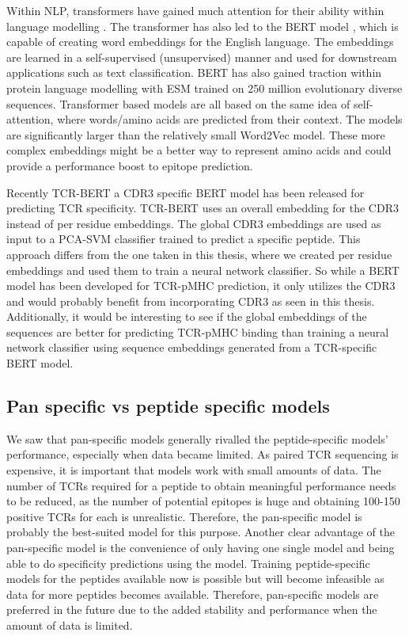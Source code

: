 Within NLP, transformers have gained much attention for their ability within language modelling \cite{Vaswani2017AttentionNeed}. The transformer has also led to the BERT model \cite{Devlin2019BERT:Understanding}, which is capable of creating word embeddings for the English language. The embeddings are learned in a self-supervised (unsupervised) manner and used for downstream applications such as text classification. BERT has also gained traction within protein language modelling with ESM \cite{doi:10.1073/pnas.2016239118} trained on 250 million evolutionary diverse sequences. Transformer based models are all based on the same idea of self-attention, where words/amino acids are predicted from their context. The models are significantly larger than the relatively small Word2Vec model. These more complex embeddings might be a better way to represent amino acids and could provide a performance boost to epitope prediction.

Recently TCR-BERT \cite{Wu2021TCR-BERT:Analyses} a CDR3{\textbeta} specific BERT model has been released for predicting TCR specificity. TCR-BERT uses an overall embedding for the CDR3{\textbeta} instead of per residue embeddings. The global CDR3{\textbeta} embeddings are used as input to a PCA-SVM classifier trained to predict a specific peptide. This approach differs from the one taken in this thesis, where we created per residue embeddings and used them to train a neural network classifier. So while a BERT model has been developed for TCR-pMHC prediction, it only utilizes the CDR3{\textbeta} and would probably benefit from incorporating CDR3{\textalpha} as seen in this thesis. Additionally, it would be interesting to see if the global embeddings of the sequences are better for predicting TCR-pMHC binding than training a neural network classifier using sequence embeddings generated from a TCR-specific BERT model.

\subsection{Pan specific vs peptide specific models}
We saw that pan-specific models generally rivalled the peptide-specific models' performance, especially when data became limited. As paired TCR sequencing is expensive, it is important that models work with small amounts of data. The number of TCRs required for a peptide to obtain meaningful performance needs to be reduced, as the number of potential epitopes is huge and obtaining 100-150 positive TCRs for each is unrealistic. Therefore, the pan-specific model is probably the best-suited model for this purpose. Another clear advantage of the pan-specific model is the convenience of only having one single model and being able to do specificity predictions using the model. Training peptide-specific models for the peptides available now is possible but will become infeasible as data for more peptides becomes available. Therefore, pan-specific models are preferred in the future due to the added stability and performance when the amount of data is limited.

